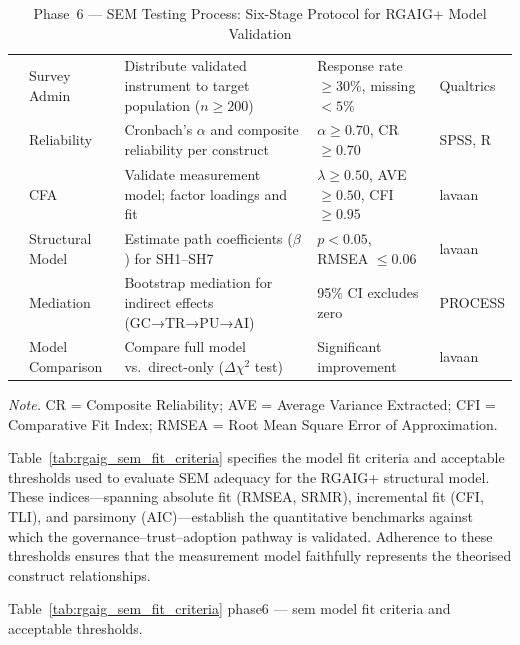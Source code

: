 \begin{xltabular}{\textwidth}{@{} c l X X l @{}}
\caption[Phase~6 --- SEM Testing Process: Six-Stage Protocol for]{Phase~6 --- SEM Testing Process: Six-Stage Protocol for RGAIG+ Model Validation}
\label{tab:rgaig_sem_process}\\
\toprule
{} &  &  &  &  \\
\midrule
\endfirsthead
\endhead
\bottomrule
{} & Survey Admin & Distribute validated instrument to target population ($n \geq 200$) & Response rate $\geq 30\%$, missing $< 5\%$ & Qualtrics \\
 & Reliability & Cronbach's $\alpha$ and composite reliability per construct & $\alpha \geq 0.70$, CR $\geq 0.70$ & SPSS, R \\
 & CFA & Validate measurement model; factor loadings and fit & $\lambda \geq 0.50$, AVE $\geq 0.50$, CFI $\geq 0.95$ & lavaan \\
 & Structural Model & Estimate path coefficients ($\beta$) for SH1--SH7 & $p < 0.05$, RMSEA $\leq 0.06$ & lavaan \\
 & Mediation & Bootstrap mediation for indirect effects (GC→TR→PU→AI) & 95\% CI excludes zero & PROCESS \\
 & Model Comparison & Compare full model vs.\ direct-only ($\Delta\chi^2$ test) & Significant improvement & lavaan \\
\end{xltabular}
\par\smallskip\noindent\textit{Note.} CR = Composite Reliability; AVE = Average Variance Extracted; CFI = Comparative Fit Index; RMSEA = Root Mean Square Error of Approximation.
\endgroup

\vspace{1.5em}

Table~\ref{tab:rgaig_sem_fit_criteria} specifies the model fit criteria and acceptable thresholds used to evaluate SEM adequacy for the RGAIG+ structural model. These indices---spanning absolute fit (RMSEA, SRMR), incremental fit (CFI, TLI), and parsimony (AIC)---establish the quantitative benchmarks against which the governance--trust--adoption pathway is validated. Adherence to these thresholds ensures that the measurement model faithfully represents the theorised construct relationships.

\begingroup\singlespacing\tablefontsize\tablestripes
\noindent Table~\ref{tab:rgaig_sem_fit_criteria} phase6 --- sem model fit criteria and acceptable thresholds.


